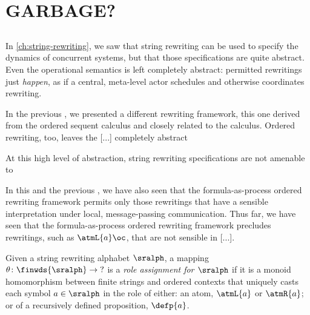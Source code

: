 \chapter{GARBAGE?}

\section{}

In \cref{ch:string-rewriting}, we saw that string rewriting can be used to specify the dynamics of concurrent systems, but that those specifications are quite abstract.
Even the operational semantics is left completely abstract: permitted rewritings just \emph{happen}, as if a central, meta-level actor schedules and otherwise coordinates rewriting.

In the previous , we presented a different rewriting framework, this one derived from the ordered sequent calculus and closely related to the \citeauthor{Lambek:AMM58} calculus\autocite{Lambek:AMM58}.
Ordered rewriting, too, leaves the [...] completely abstract

At this high level of abstraction, string rewriting specifications are not amenable to 

In this and the previous , we have also seen that the formula-as-process ordered rewriting framework permits only those rewritings that have a sensible interpretation under local, message-passing communication.
Thus far, we have seen that the formula-as-process ordered rewriting framework precludes rewritings, such as $\atmL{a} \oc $, that are not sensible in [...].


Given a string rewriting alphabet $\sralph$, a mapping $\theta\colon \finwds{\sralph} \to {?}$ is a \emph{role assignment for $\sralph$} if it is a monoid homomorphism between finite strings and ordered contexts that uniquely casts each symbol $a \in \sralph$ in the role of either: an atom, $\atmL{a}$ or $\atmR{a}$; or of a recursively defined proposition, $\defp{a}$.

